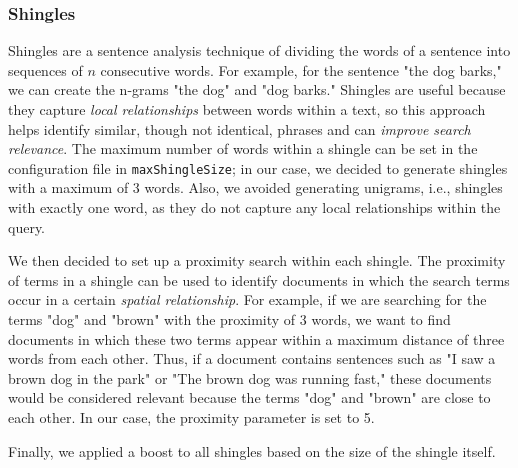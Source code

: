 \subsubsection{Shingles}
\label{subsubsec:shingles}

Shingles are a sentence analysis technique of dividing the words of a sentence into sequences of $n$ consecutive words. For example, for the sentence "the dog barks," we can create the n-grams "the dog" and "dog barks." Shingles are useful because they capture \emph{local relationships} between words within a text, so this approach helps identify similar, though not identical, phrases and can \emph{improve search relevance}.
The maximum number of words within a shingle can be set in the configuration file in \texttt{maxShingleSize}; in our case, we decided to generate shingles with a maximum of 3 words. Also, we avoided generating unigrams, i.e., shingles with exactly one word, as they do not capture any local relationships within the query.

We then decided to set up a proximity search within each shingle. The proximity of terms in a shingle can be used to identify documents in which the search terms occur in a certain \emph{spatial relationship}.
For example, if we are searching for the terms "dog" and "brown" with the proximity of 3 words, we want to find documents in which these two terms appear within a maximum distance of three words from each other. Thus, if a document contains sentences such as "I saw a brown dog in the park" or "The brown dog was running fast," these documents would be considered relevant because the terms "dog" and "brown" are close to each other. In our case, the proximity parameter is set to 5.

Finally, we applied a boost to all shingles based on the size of the shingle itself.
